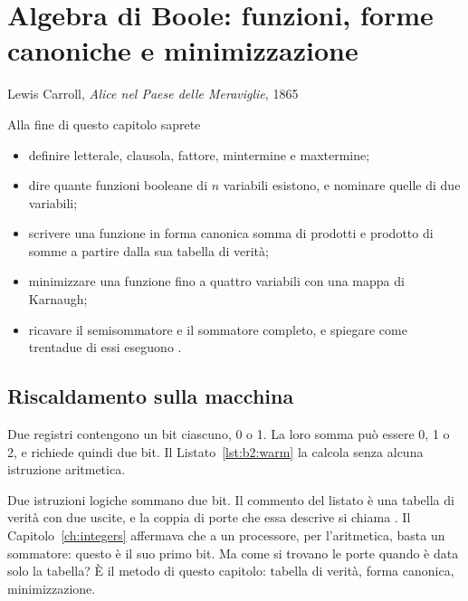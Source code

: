 \chapter{Algebra di Boole: funzioni, forme canoniche e minimizzazione}
\label{ch:boole2}

  {Lewis Carroll, \emph{Alice nel Paese delle Meraviglie}, 1865}

\begin{chapgoals}
Alla fine di questo capitolo saprete
\begin{itemize}
\item definire letterale, clausola, fattore, mintermine e maxtermine;
\item dire quante funzioni booleane di $n$ variabili esistono, e nominare quelle di due variabili;
\item scrivere una funzione in forma canonica somma di prodotti e prodotto di somme a partire dalla sua tabella di verità;
\item minimizzare una funzione fino a quattro variabili con una mappa di Karnaugh;
\item ricavare il semisommatore e il sommatore completo, e spiegare come trentadue di essi eseguono .
\end{itemize}
\end{chapgoals}


\section{Riscaldamento sulla macchina}

Due registri contengono un bit ciascuno, 0 o 1. La loro somma può essere 0, 1
o 2, e richiede quindi due bit. Il Listato~\ref{lst:b2:warm} la calcola senza
alcuna istruzione aritmetica.


Due istruzioni logiche sommano due bit. Il commento del listato è una tabella
di verità con due uscite, e la coppia di porte che essa descrive si chiama
. Il Capitolo~\ref{ch:integers} affermava che a un
processore, per l'aritmetica, basta un sommatore: questo è il suo primo bit. Ma
come si trovano le porte quando è data solo la tabella? È il metodo di questo
capitolo: tabella di verità, forma canonica, minimizzazione.

